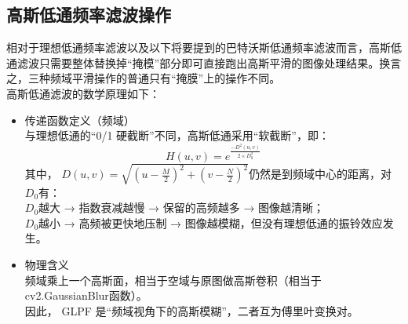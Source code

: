 \documentclass[11pt]{article}
\begin{document}
    \subsection{高斯低通频率滤波操作}
    相对于理想低通频率滤波以及以下将要提到的巴特沃斯低通频率滤波而言，高斯低通滤波只需要整体替换掉“掩模”部分即可直接跑出高斯平滑的图像处理结果。换言之，三种频域平滑操作的普通只有“掩膜”上的操作不同。\\
    高斯低通滤波的数学原理如下：
    \begin{itemize}
    	\item 传递函数定义（频域）\\
    	与理想低通的“0/1 硬截断”不同，高斯低通采用“软截断”，即：
    	$$H(u,v) = e^{\frac{−D^{2}(u,v)}{2 \times D_{0}^2} }$$
    	其中，
    	$D(u,v) = \sqrt{(u−\frac{M}{2})^2+(v−\frac{N}{2})^2}$仍然是到频域中心的距离，对$D_0$有：\\
    	$D_0$越大 → 指数衰减越慢 → 保留的高频越多 → 图像越清晰；\\
    	$D_0$越小 → 高频被更快地压制 → 图像越模糊，但没有理想低通的振铃效应发生。
    	\item 物理含义\\
    	频域乘上一个高斯面，相当于空域与原图做高斯卷积（相当于cv2.GaussianBlur函数）。\\
    	因此， GLPF 是“频域视角下的高斯模糊”，二者互为傅里叶变换对。
    \end{itemize}
    
\end{document}
